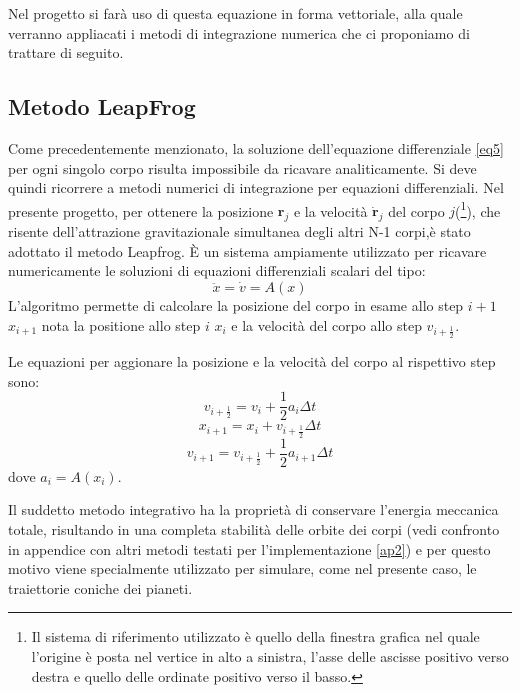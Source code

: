 \documentclass{article}
\begin{document}
Nel progetto si farà uso di questa equazione in forma vettoriale, alla quale verranno appliacati i metodi di integrazione numerica che ci proponiamo di trattare di seguito.
\subsection{Metodo LeapFrog}
Come precedentemente menzionato, la soluzione dell'equazione differenziale \ref{eq5} per ogni singolo corpo risulta impossibile da ricavare analiticamente. Si deve quindi ricorrere a metodi numerici di integrazione per equazioni differenziali.
Nel presente progetto,  per ottenere la posizione $\mathbf{r}_{j}$ e la velocità $\mathbf{\dot{r}}_{j}$ del corpo $j$(\footnote{Il sistema di riferimento utilizzato è quello della finestra grafica nel quale  l'origine è posta nel vertice in alto a sinistra, l'asse delle ascisse positivo verso destra e quello delle ordinate positivo verso il basso.}), che risente dell'attrazione gravitazionale simultanea degli altri N-1 corpi,è stato adottato il metodo Leapfrog.
È un sistema ampiamente utilizzato per ricavare numericamente le soluzioni di equazioni differenziali scalari del tipo:
\begin{equation}
    \ddot{x}=\dot{v}=A(x)
\end{equation}
L'algoritmo permette di calcolare la posizione del corpo in esame allo step $i+1$ $x_{i+1}$ nota la positione allo step $i$ $x_{i}$ e la velocità del corpo allo step $v_{i+\frac{1}{2}}$.

Le equazioni per aggionare la posizione e la velocità del corpo al rispettivo step sono:
\begin{equation}
    v_{i+\frac{1}{2}}=v_{i}+\frac{1}{2}a_{i}\Delta t
\end{equation}
\begin{equation}
    x_{i+1}=x_{i}+v_{i+\frac{1}{2}}\Delta t
\end{equation}
\begin{equation}
    v_{i+1}=v_{i+\frac{1}{2}}+ \frac{1}{2}a_{i+1}\Delta t
\end{equation}
dove $a_{i}=A(x_{i})$.

Il suddetto metodo integrativo ha la proprietà di conservare l'energia meccanica totale, risultando in una completa stabilità delle orbite dei corpi (vedi confronto in appendice con altri metodi testati per l'implementazione \ref{ap2}) e per questo motivo viene specialmente utilizzato per simulare, come nel presente caso, le traiettorie coniche dei pianeti.
\end{document}
